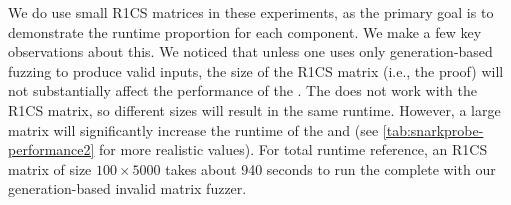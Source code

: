 We do use small R1CS matrices in these experiments, as the primary goal is to demonstrate the runtime proportion for each component.  We make a few key observations about this.  We noticed that unless one uses only generation-based fuzzing to produce valid inputs, the size of the R1CS matrix (i.e., the proof) will not substantially affect the performance of the .  The \branchmodel does not work with the R1CS matrix, so different sizes will result in the same runtime.
However, a large matrix will significantly increase the runtime of the  and  (see \autoref{tab:snarkprobe-performance2} for more realistic values).  For total runtime reference, an R1CS matrix of size $100 \times 5000$ takes about 940 seconds to run the complete \SnarkFuzzer with our generation-based invalid matrix fuzzer.





